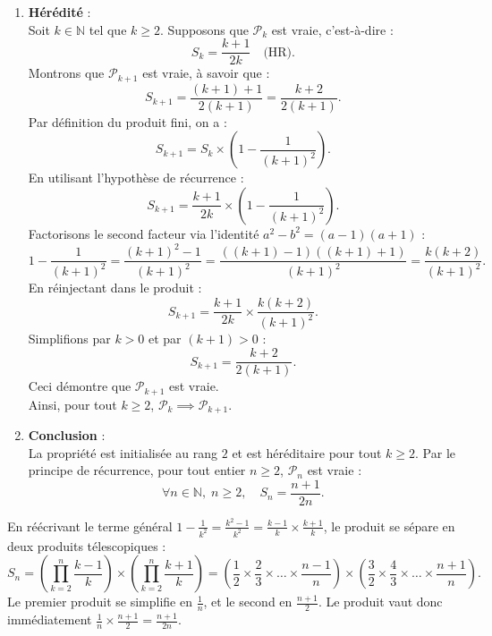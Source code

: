 \documentclass[11pt,a4paper]{article}
\newcommand{\N}{\mathbb{N}}
\begin{document}
\begin{correctionbox}
\begin{enumerate}[label=\textbf{\arabic*.}]
    \item \textbf{Hérédité} :\\
    Soit $k \in \N$ tel que $k \ge 2$. Supposons que $\mathcal{P}_k$ est vraie, c'est-à-dire :
    \[
    S_k = \frac{k+1}{2k} \quad \text{(HR)}.
    \]
    Montrons que $\mathcal{P}_{k+1}$ est vraie, à savoir que :
    \[
    S_{k+1} = \frac{(k+1)+1}{2(k+1)} = \frac{k+2}{2(k+1)}.
    \]
    Par définition du produit fini, on a :
    \[
    S_{k+1} = S_k \times \left(1 - \frac{1}{(k+1)^2}\right).
    \]
    En utilisant l'hypothèse de récurrence :
    \[
    S_{k+1} = \frac{k+1}{2k} \times \left(1 - \frac{1}{(k+1)^2}\right).
    \]
    Factorisons le second facteur via l'identité $a^2 - b^2 = (a-1)(a+1)$ :
    \[
    1 - \frac{1}{(k+1)^2} = \frac{(k+1)^2 - 1}{(k+1)^2} = \frac{((k+1)-1)((k+1)+1)}{(k+1)^2} = \frac{k(k+2)}{(k+1)^2}.
    \]
    En réinjectant dans le produit :
    \[
    S_{k+1} = \frac{k+1}{2k} \times \frac{k(k+2)}{(k+1)^2}.
    \]
    Simplifions par $k > 0$ et par $(k+1) > 0$ :
    \[
    S_{k+1} = \frac{k+2}{2(k+1)}.
    \]
    Ceci démontre que $\mathcal{P}_{k+1}$ est vraie.\\
    Ainsi, pour tout $k \ge 2$, $\mathcal{P}_k \implies \mathcal{P}_{k+1}$.

    \item \textbf{Conclusion} :\\
    La propriété est initialisée au rang $2$ et est héréditaire pour tout $k \ge 2$. Par le principe de récurrence, pour tout entier $n \ge 2$, $\mathcal{P}_n$ est vraie :
    \[
    \forall n \in \N, \; n \ge 2, \quad S_n = \frac{n+1}{2n}.
    \]
\end{enumerate}
\end{correctionbox}

\begin{remarquabox}
En réécrivant le terme général $1 - \frac{1}{k^2} = \frac{k^2-1}{k^2} = \frac{k-1}{k} \times \frac{k+1}{k}$, le produit se sépare en deux produits télescopiques :
\[
S_n = \left(\prod_{k=2}^n \frac{k-1}{k}\right) \times \left(\prod_{k=2}^n \frac{k+1}{k}\right) = \left(\frac{1}{2} \times \frac{2}{3} \times \dots \times \frac{n-1}{n}\right) \times \left(\frac{3}{2} \times \frac{4}{3} \times \dots \times \frac{n+1}{n}\right).
\]
Le premier produit se simplifie en $\frac{1}{n}$, et le second en $\frac{n+1}{2}$. Le produit vaut donc immédiatement $\frac{1}{n} \times \frac{n+1}{2} = \frac{n+1}{2n}$.
\end{remarquabox}
\end{document}
